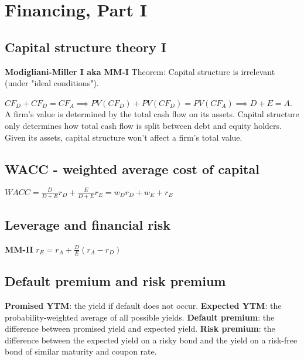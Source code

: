 \section{Financing, Part I}

\subsection*{Capital structure theory I}

{\bf Modigliani-Miller I aka MM-I} Theorem: Capital structure is irrelevant (under "ideal conditions").

$CF_D + CF_D = CF_A \implies PV(CF_D) + PV(CF_D) = PV(CF_A) \implies D+E=A $.  A firm’s value is determined by the total cash flow on its assets.
Capital structure only determines how total cash flow is split between debt
and equity holders. Given its assets, capital structure won’t affect a firm’s total value.

\subsection*{WACC - weighted average cost of capital}
$WACC=\frac{D}{D+E}r_D + \frac{E}{D+E}r_E = w_D r_D + w_E + r_E$

\subsection*{Leverage and financial risk}

{\bf MM-II}  $r_E = r_A + \frac{D}{E} (r_A-r_D)$

\subsection*{Default premium and risk premium}

{\bf Promised YTM}: the yield if default does not occur.
{\bf Expected YTM}: the probability-weighted average of all possible yields.
{\bf Default premium}: the difference between promised yield and expected yield.
{\bf Risk premium}: the difference between the expected yield on a risky bond and the yield on a risk-free bond of similar maturity and coupon rate.

\usetikzlibrary{decorations.pathreplacing}


